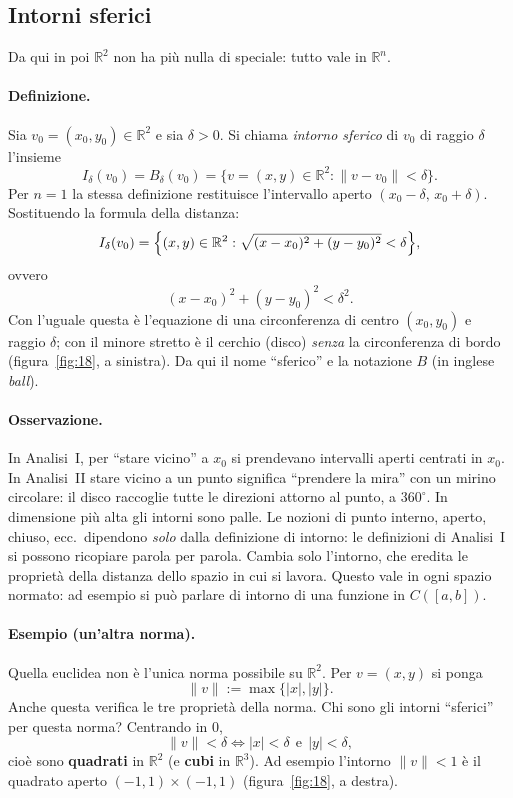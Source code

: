 \subsection{Intorni sferici}

Da qui in poi $\mathbb{R}^2$ non ha più nulla di speciale: tutto vale in $\mathbb{R}^n$.

\paragraph{Definizione.} Sia $v_0=(x_0,y_0)\in\mathbb{R}^2$ e sia $\delta>0$. Si chiama \emph{intorno sferico} di $v_0$ di raggio $\delta$ l'insieme
\[
  I_\delta(v_0)=B_\delta(v_0)=\bigl\{v=(x,y)\in\mathbb{R}^2 : \|v-v_0\|<\delta\bigr\}.
\]
Per $n=1$ la stessa definizione restituisce l'intervallo aperto $(x_0-\delta,\,x_0+\delta)$.
Sostituendo la formula della distanza:
\[
  I_\delta(v_0)=\Bigl\{(x,y)\in\mathbb{R}^2 : \sqrt{(x-x_0)^2+(y-y_0)^2}<\delta\Bigr\},
\]
ovvero
\[
  (x-x_0)^2+(y-y_0)^2<\delta^2 .
\]
Con l'uguale questa è l'equazione di una circonferenza di centro $(x_0,y_0)$ e raggio $\delta$; con il minore stretto è il cerchio (disco) \emph{senza} la circonferenza di bordo (figura~\ref{fig:18}, a sinistra). Da qui il nome ``sferico'' e la notazione $B$ (in inglese \emph{ball}).

\paragraph{Osservazione.} In Analisi~I, per ``stare vicino'' a $x_0$ si prendevano intervalli aperti centrati in $x_0$. In Analisi~II stare vicino a un punto significa ``prendere la mira'' con un mirino circolare: il disco raccoglie tutte le direzioni attorno al punto, a $360^\circ$. In dimensione più alta gli intorni sono palle.
Le nozioni di punto interno, aperto, chiuso, ecc.\ dipendono \emph{solo} dalla definizione di intorno: le definizioni di Analisi~I si possono ricopiare parola per parola. Cambia solo l'intorno, che eredita le proprietà della distanza dello spazio in cui si lavora.
Questo vale in ogni spazio normato: ad esempio si può parlare di intorno di una funzione in $C([a,b])$.

\paragraph{Esempio (un'altra norma).} Quella euclidea non è l'unica norma possibile su $\mathbb{R}^2$. Per $v=(x,y)$ si ponga
\[
  \|v\|:=\max\{|x|,|y|\}.
\]
Anche questa verifica le tre proprietà della norma. Chi sono gli intorni ``sferici'' per questa norma? Centrando in $0$,
\[
  \|v\|<\delta \iff |x|<\delta\ \ \text{e}\ \ |y|<\delta ,
\]
cioè sono \textbf{quadrati} in $\mathbb{R}^2$ (e \textbf{cubi} in $\mathbb{R}^3$). Ad esempio l'intorno $\|v\|<1$ è il quadrato aperto $(-1,1)\times(-1,1)$ (figura~\ref{fig:18}, a destra).

